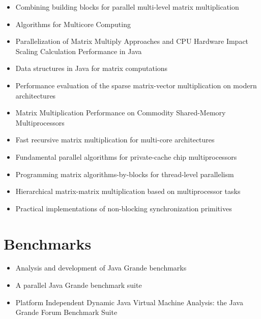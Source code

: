 \begin{itemize}
  \cite{Gunnels1998}
\item Combining building blocks for parallel multi-level matrix
  multiplication \cite{Hunold2008}
\item Algorithms for Multicore Computing \cite{Ramachandran2008}
\item Parallelization of Matrix Multiply Approaches and CPU Hardware
  Impact Scaling Calculation Performance in Java \cite{Kim2010}
\item Data structures in Java for matrix computations
  \cite{Gundersen2004}
\item Performance evaluation of the sparse matrix-vector
  multiplication on modern architectures \cite{Goumas2009}
\item Matrix Multiplication Performance on Commodity Shared-Memory
  Multiprocessors \cite{Tsilikas2004}
\item Fast recursive matrix multiplication for multi-core
  architectures \cite{Runger2010}
\item Fundamental parallel algorithms for private-cache chip
  multiprocessors \cite{Arge2008}
\item Programming matrix algorithms-by-blocks for thread-level
  parallelism \cite{Quintana-Orti2009}
\item Hierarchical matrix-matrix multiplication based on
  multiprocessor tasks \cite{Hunold2004}
\item Practical implementations of non-blocking synchronization
  primitives \cite{Moir1997}
\end{itemize}


\section*{Benchmarks}
\label{sec:lr-benchmarks}

\begin{itemize}
\item[\checkmark] Analysis and development of Java Grande benchmarks
  \cite{Mathew1999}
\item[\checkmark] A parallel Java Grande benchmark suite
  \cite{Smith2001}
\item[\checkmark] Platform Independent Dynamic Java Virtual Machine
  Analysis: the Java Grande Forum Benchmark Suite \cite{Gregg2003}
\end{itemize}


